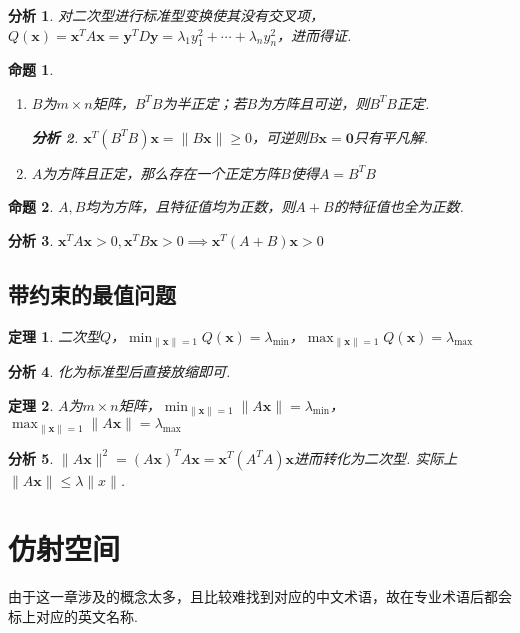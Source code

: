 \documentclass[11pt,UTF8]{ctexart}
\newtheorem{theorem}{定理}
\newtheorem{proposition}{命题}
\newtheorem*{analysis}{分析}
\def\vx{\mathbf{x}}
\def\dis{\displaystyle}
\newcommand{\vb}[1]{\mathbf{#1}}
\begin{document}
\begin{analysis}
对二次型进行标准型变换使其没有交叉项，$Q(\vx)=\vx^TA\vx=\vb{y}^TD\vb{y}=\lambda_1y_1^2+\cdots+\lambda_ny_n^2$，进而得证.
\end{analysis}
\begin{proposition}
\begin{enumerate}
\itemsep -3pt
\item $B$为$m\times n$矩阵，$B^TB$为半正定；若$B$为方阵且可逆，则$B^TB$正定.
\begin{analysis}
$\vx^T(B^TB)\vx=\|B\vx\|\geq 0$，可逆则$B\vx=\vb{0}$只有平凡解.
\end{analysis}
\item $A$为方阵且正定，那么存在一个正定方阵$B$使得$A=B^TB$
\end{enumerate}
\end{proposition}
\begin{proposition}
$A,B$均为方阵，且特征值均为正数，则$A+B$的特征值也全为正数.
\end{proposition}
\begin{analysis}
$\vx^TA\vx>0,\vx^TB\vx>0\implies\vx^T(A+B)\vx>0$
\end{analysis}

\subsection{带约束的最值问题}
\begin{theorem}
二次型$Q$，$\dis\min_{\|\vx\|=1}Q(\vx)=\lambda_{\min}$，$\dis\max_{\|\vx\|=1}Q(\vx)=\lambda_{\max}$
\end{theorem}
\begin{analysis}
化为标准型后直接放缩即可.
\end{analysis}
\begin{theorem}
$A$为$m\times n$矩阵，$\dis\min_{\|\vx\|=1}\|A\vx\|=\lambda_{\min}$，$\dis\max_{\|\vx\|=1}\|A\vx\|=\lambda_{\max}$
\end{theorem}
\begin{analysis}
$\|A\vx\|^2=(A\vx)^TA\vx=\vx^T(A^TA)\vx$进而转化为二次型. 实际上$\|A\vx\|\leq\lambda\|x\|$.
\end{analysis}

\section{仿射空间}
由于这一章涉及的概念太多，且比较难找到对应的中文术语，故在专业术语后都会标上对应的英文名称.
\end{document}
